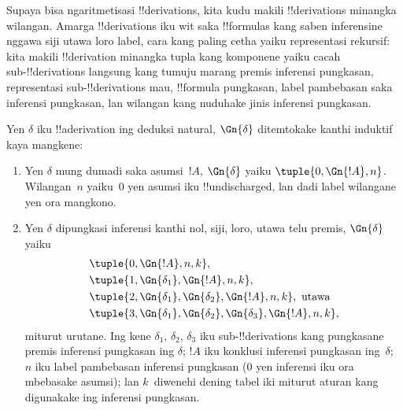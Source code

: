 \documentclass[../../../include/open-logic-section]{subfiles}
\begin{document}

\begin{explain}
Supaya bisa ngaritmetisasi !!{derivation}s, kita kudu makili
!!{derivation}s minangka wilangan. Amarga !!{derivation}s iku wit
saka !!{formula}s kang saben inferensine nggawa siji utawa loro
label, cara kang paling cetha yaiku representasi rekursif: kita
makili !!{derivation} minangka tupla kang komponene yaiku cacah
sub-!!{derivation}s langsung kang tumuju marang premis inferensi
pungkasan, representasi sub-!!{derivation}s mau, !!{formula}
pungkasan, label pambebasan saka inferensi pungkasan, lan wilangan
kang nuduhake jinis inferensi pungkasan.
\end{explain}

\begin{defn}
  Yen $\delta$ iku !!a{derivation} ing deduksi natural, $\Gn{\delta}$
  ditemtokake kanthi induktif kaya mangkene:
  \begin{enumerate}
  \item 
    Yen $\delta$ mung dumadi saka asumsi~$!A$, $\Gn{\delta}$
    yaiku $\tuple{0, \Gn{!A}, n}$. Wilangan~$n$ yaiku~$0$
    yen asumsi iku !!{undischarged}, lan dadi label wilangane
    yen ora mangkono.
  \item 
    Yen $\delta$ dipungkasi inferensi kanthi nol, siji, loro,
    utawa telu premis, $\Gn{\delta}$ yaiku
    \begin{align*}
      & \tuple{0, \Gn{!A}, n, k}, \\
      & \tuple{1, \Gn{\delta_1}, \Gn{!A}, n, k}, \\
      & \tuple{2, \Gn{\delta_1}, \Gn{\delta_2}, \Gn{!A}, n, k}, \text{ utawa}\\
      & \tuple{3, \Gn{\delta_1}, \Gn{\delta_2}, \Gn{\delta_3}, \Gn{!A}, n,
        k},
    \end{align*}
    miturut urutane. Ing kene $\delta_1$, $\delta_2$, $\delta_3$
    iku sub-!!{derivation}s kang pungkasane premis inferensi
    pungkasan ing $\delta$; $!A$ iku konklusi inferensi pungkasan
    ing~$\delta$; $n$ iku label pambebasan inferensi pungkasan
    ($0$ yen inferensi iku ora mbebasake asumsi); lan $k$~diwenehi
    dening tabel iki miturut aturan kang digunakake ing inferensi
    pungkasan.
  

\end{enumerate}
\end{defn}
\end{document}
